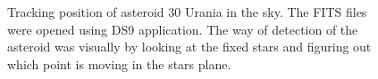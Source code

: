\documentclass[letterpaper,12pt]{article}
\begin{document}
\begin{figure}[h!]
                                                                                                                                                                                                                                                                                                                                                                                                                                                                                                                                                                                                                                                                                                                                                                                                                                                                                                                                                                                \caption{Tracking position of asteroid 30 Urania in the sky. The FITS files were opened using DS9 application. The way of detection of the asteroid was visually by looking at the fixed stars and figuring out which point is moving in the stars plane.}

\end{figure}
\end{document}

